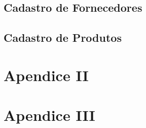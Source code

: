 \documentclass[
]{book}
\begin{document}
\section{Cadastro de Fornecedores}\label{cadastro-de-fornecedores-1}

\section{Cadastro de Produtos}\label{cadastro-de-produtos-1}

\chapter{Apendice II}\label{apendice-ii}

\chapter{Apendice III}\label{apendice-iii}

  
\end{document}
